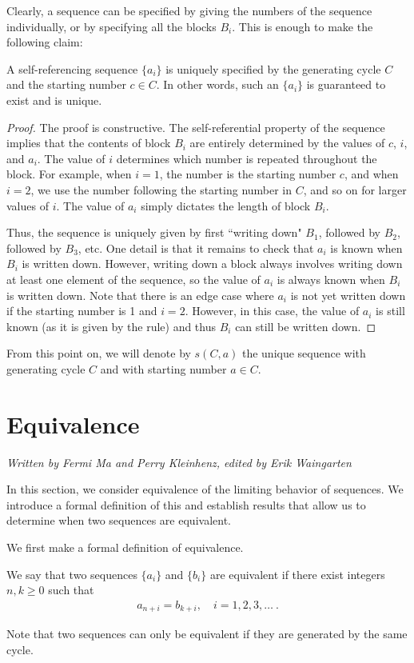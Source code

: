 \documentclass[runningheads,a4paper]{llncs}
\begin{document}
Clearly, a sequence can be specified by giving the numbers of the sequence individually, or by specifying all the blocks $B_i$. This is enough to make the following claim:

\begin{proposition}
A self-referencing sequence $\{a_i\}$ is uniquely specified by the generating cycle $C$ and the starting number $c \in C$. In other words, such an $\{a_i\}$ is guaranteed to exist and is unique.
\end{proposition}
\begin{proof} 
The proof is constructive. The self-referential property of the sequence implies that the contents of block $B_i$ are entirely determined by the values of $c$, $i$, and $a_i$. The value of $i$ determines which number is repeated throughout the block. For example, when $i = 1$, the number is the starting number $c$, and when $i = 2$, we use the number following the starting number in $C$, and so on for larger values of $i$. The value of $a_i$ simply dictates the length of block $B_i$.

Thus, the sequence is uniquely given by first ``writing down" $B_1$, followed by $B_2$, followed by $B_3$, etc. One detail is that it remains to check that $a_i$ is known when $B_i$ is written down. However, writing down a block always involves writing down at least one element of the sequence, so the value of $a_i$ is always known when $B_i$ is written down. Note that there is an edge case where $a_i$ is not yet written down if the starting number is 1 and $i =2$. However, in this case, the value of $a_i$ is still known (as it is given by the rule) and thus $B_i$ can still be written down.
\end{proof}

From this point on, we will denote by $s(C,a)$ the unique sequence with generating cycle $C$ and with starting number $a \in C$.

\section{Equivalence}
\label{equivalence}
\emph{Written by Fermi Ma and Perry Kleinhenz, edited by Erik Waingarten}

In this section, we consider equivalence of the limiting behavior of sequences. We introduce a formal definition of this and establish results that allow us to determine when two sequences are equivalent.  

We first make a formal definition of equivalence. 
\begin{definition}
We say that two sequences $\{a_i\}$ and $\{b_i\}$ are equivalent if there exist integers $n, k \geq 0$ such that 
\begin{align*}
a_{n+i} = b_{k+i}, \quad i=1,2,3,\ldots \ .
\end{align*}
\end{definition}
Note that two sequences can only be equivalent if they are generated by the same cycle.
\end{document}
